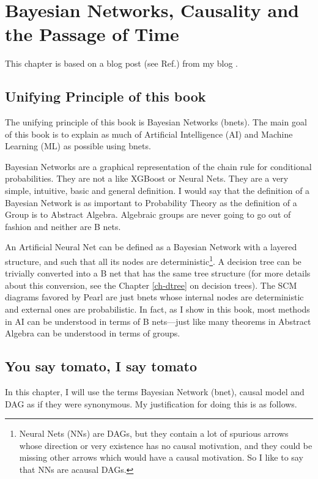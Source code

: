 \chapter{Bayesian Networks, Causality and the
Passage of Time}

\label{ch-bnets-time}

This chapter is based
on a blog post (see Ref.\cite{bnets-passage-time})
from my blog .

\section{Unifying Principle of this book}
The unifying principle of this
book is Bayesian Networks (bnets).
The main goal of this book
is to explain
as much of Artificial Intelligence (AI)
and Machine Learning (ML)
as possible
using bnets.

Bayesian Networks are a graphical representation of the chain rule for
conditional probabilities.
 They are not a  like XGBoost or Neural Nets.
They are a very simple, intuitive, basic and general definition. I would say
that the definition of a Bayesian Network is as important to Probability
Theory as the definition of a Group is to Abstract Algebra. Algebraic groups
are never going to go out of fashion and neither are B nets.

An Artificial Neural Net can be defined as a Bayesian Network with a layered
structure, and such that all its nodes are deterministic\footnote{Neural Nets (NNs)
are DAGs, but they contain a lot of 
spurious arrows whose direction
or very existence has no causal motivation,
and they could be missing
other arrows which 
would have a causal motivation.
 So I like to
say that NNs are acausal DAGs.}. A decision tree
 can be trivially converted into a
B net that has the same tree structure (for more details about
this conversion, see the Chapter \ref{ch-dtree} on decision trees).
The SCM diagrams favored by Pearl are just bnets
whose internal nodes are deterministic and external ones
are probabilistic.
In fact, as I show in this book, most methods in AI can be
understood in terms of B nets---just
like many theorems in Abstract Algebra
can be understood in terms of groups.



\section{You say tomato, I say tomato}
In this chapter, I will use the terms Bayesian Network
(bnet), causal model and DAG as if they were synonymous.
My justification for doing this is as follows.


